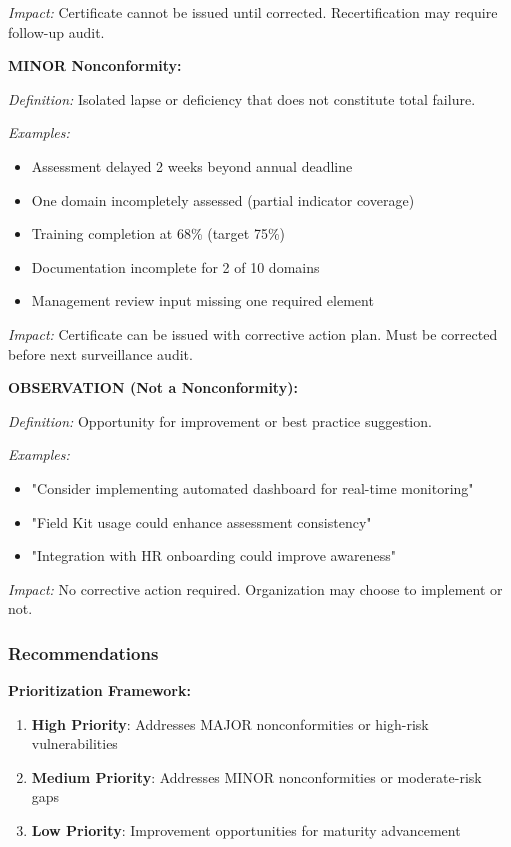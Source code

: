 \documentclass[11pt,a4paper]{article}
\begin{document}
\textit{Impact:} Certificate cannot be issued until corrected. Recertification may require follow-up audit.

\textbf{MINOR Nonconformity:}

\textit{Definition:} Isolated lapse or deficiency that does not constitute total failure.

\textit{Examples:}
\begin{itemize}
\item Assessment delayed 2 weeks beyond annual deadline
\item One domain incompletely assessed (partial indicator coverage)
\item Training completion at 68\% (target 75\%)
\item Documentation incomplete for 2 of 10 domains
\item Management review input missing one required element
\end{itemize}

\textit{Impact:} Certificate can be issued with corrective action plan. Must be corrected before next surveillance audit.

\textbf{OBSERVATION (Not a Nonconformity):}

\textit{Definition:} Opportunity for improvement or best practice suggestion.

\textit{Examples:}
\begin{itemize}
\item "Consider implementing automated dashboard for real-time monitoring"
\item "Field Kit usage could enhance assessment consistency"
\item "Integration with HR onboarding could improve awareness"
\end{itemize}

\textit{Impact:} No corrective action required. Organization may choose to implement or not.

\subsubsection{Recommendations}

\textbf{Prioritization Framework:}

\begin{enumerate}
\item \textbf{High Priority}: Addresses MAJOR nonconformities or high-risk vulnerabilities
\item \textbf{Medium Priority}: Addresses MINOR nonconformities or moderate-risk gaps
\item \textbf{Low Priority}: Improvement opportunities for maturity advancement
\end{enumerate}
\end{document}
